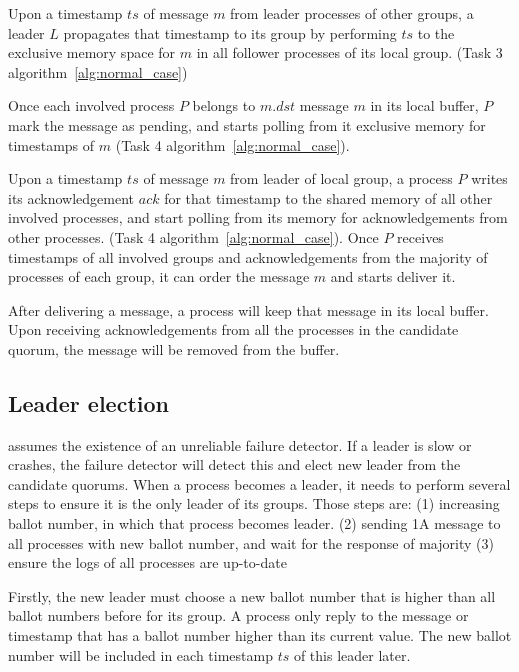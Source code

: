 Upon \lread a timestamp $ts$ of message $m$ from leader processes of other
groups, a leader $L$ propagates that timestamp to its group by performing
\rwrite $ts$ to the exclusive memory space for $m$ in all follower processes of
its local group. (Task 3 algorithm~\ref{alg:normal_case})

Once each involved process $P$ belongs to $m.dst$ \lread message $m$ in its
local buffer, $P$ mark the message as pending, and starts polling from it
exclusive memory for timestamps of $m$ (Task 4 algorithm~\ref{alg:normal_case}).

Upon \lread a timestamp $ts$ of message $m$ from leader of local group, a
process $P$ writes its acknowledgement $ack$ for that timestamp to the shared
memory of all other involved processes, and start polling from its memory for
acknowledgements from other processes. (Task 4 algorithm~\ref{alg:normal_case}).
Once $P$ receives timestamps of all involved groups and acknowledgements from
the majority of processes of each group, it can order the message $m$ and starts
deliver it.

After delivering a message, a process will keep that message in its local buffer.
Upon receiving acknowledgements from all the processes in the candidate
quorum, the message will be removed from the buffer.

\subsection{Leader election}



\libname assumes the existence of an unreliable failure detector. If a leader is
slow or crashes, the failure detector will detect this and elect new leader from
the candidate quorums. When a process becomes a leader, it needs to perform
several steps to ensure it is the only leader of its groups. Those steps are:
(1) increasing ballot number, in which that process becomes leader. (2) sending
1A message to all processes with new ballot number, and wait for the response of
majority (3) ensure the logs of all processes are up-to-date

Firstly, the new leader must choose a new ballot number that is higher than all
ballot numbers before for its group. A process only reply to the message or
timestamp that has a ballot number higher than its current value. The new ballot
number will be included in each timestamp $ts$ of this leader later.

